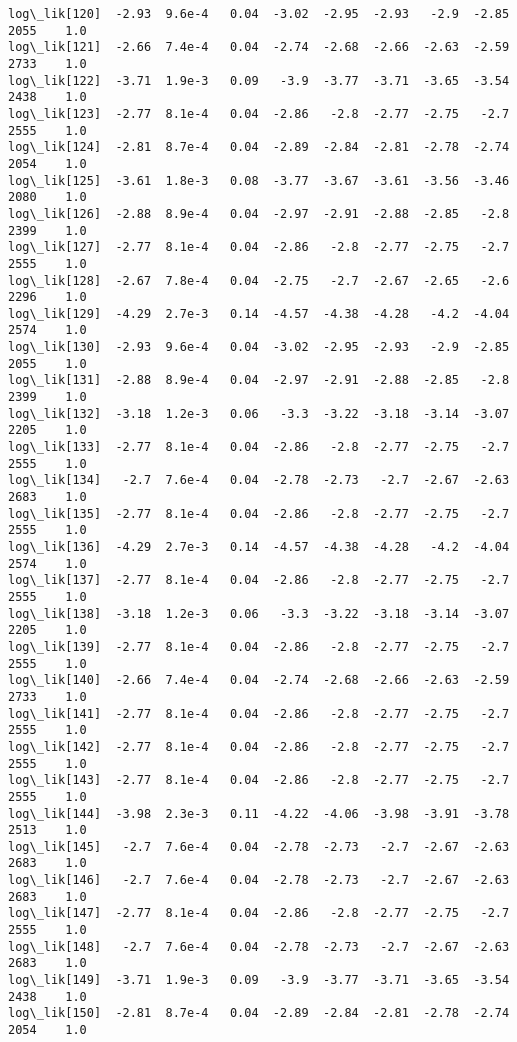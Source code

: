 \documentclass[11pt]{article}
\begin{document}
\begin{Verbatim}[commandchars=\\\{\}]
log\_lik[120]  -2.93  9.6e-4   0.04  -3.02  -2.95  -2.93   -2.9  -2.85   2055    1.0
log\_lik[121]  -2.66  7.4e-4   0.04  -2.74  -2.68  -2.66  -2.63  -2.59   2733    1.0
log\_lik[122]  -3.71  1.9e-3   0.09   -3.9  -3.77  -3.71  -3.65  -3.54   2438    1.0
log\_lik[123]  -2.77  8.1e-4   0.04  -2.86   -2.8  -2.77  -2.75   -2.7   2555    1.0
log\_lik[124]  -2.81  8.7e-4   0.04  -2.89  -2.84  -2.81  -2.78  -2.74   2054    1.0
log\_lik[125]  -3.61  1.8e-3   0.08  -3.77  -3.67  -3.61  -3.56  -3.46   2080    1.0
log\_lik[126]  -2.88  8.9e-4   0.04  -2.97  -2.91  -2.88  -2.85   -2.8   2399    1.0
log\_lik[127]  -2.77  8.1e-4   0.04  -2.86   -2.8  -2.77  -2.75   -2.7   2555    1.0
log\_lik[128]  -2.67  7.8e-4   0.04  -2.75   -2.7  -2.67  -2.65   -2.6   2296    1.0
log\_lik[129]  -4.29  2.7e-3   0.14  -4.57  -4.38  -4.28   -4.2  -4.04   2574    1.0
log\_lik[130]  -2.93  9.6e-4   0.04  -3.02  -2.95  -2.93   -2.9  -2.85   2055    1.0
log\_lik[131]  -2.88  8.9e-4   0.04  -2.97  -2.91  -2.88  -2.85   -2.8   2399    1.0
log\_lik[132]  -3.18  1.2e-3   0.06   -3.3  -3.22  -3.18  -3.14  -3.07   2205    1.0
log\_lik[133]  -2.77  8.1e-4   0.04  -2.86   -2.8  -2.77  -2.75   -2.7   2555    1.0
log\_lik[134]   -2.7  7.6e-4   0.04  -2.78  -2.73   -2.7  -2.67  -2.63   2683    1.0
log\_lik[135]  -2.77  8.1e-4   0.04  -2.86   -2.8  -2.77  -2.75   -2.7   2555    1.0
log\_lik[136]  -4.29  2.7e-3   0.14  -4.57  -4.38  -4.28   -4.2  -4.04   2574    1.0
log\_lik[137]  -2.77  8.1e-4   0.04  -2.86   -2.8  -2.77  -2.75   -2.7   2555    1.0
log\_lik[138]  -3.18  1.2e-3   0.06   -3.3  -3.22  -3.18  -3.14  -3.07   2205    1.0
log\_lik[139]  -2.77  8.1e-4   0.04  -2.86   -2.8  -2.77  -2.75   -2.7   2555    1.0
log\_lik[140]  -2.66  7.4e-4   0.04  -2.74  -2.68  -2.66  -2.63  -2.59   2733    1.0
log\_lik[141]  -2.77  8.1e-4   0.04  -2.86   -2.8  -2.77  -2.75   -2.7   2555    1.0
log\_lik[142]  -2.77  8.1e-4   0.04  -2.86   -2.8  -2.77  -2.75   -2.7   2555    1.0
log\_lik[143]  -2.77  8.1e-4   0.04  -2.86   -2.8  -2.77  -2.75   -2.7   2555    1.0
log\_lik[144]  -3.98  2.3e-3   0.11  -4.22  -4.06  -3.98  -3.91  -3.78   2513    1.0
log\_lik[145]   -2.7  7.6e-4   0.04  -2.78  -2.73   -2.7  -2.67  -2.63   2683    1.0
log\_lik[146]   -2.7  7.6e-4   0.04  -2.78  -2.73   -2.7  -2.67  -2.63   2683    1.0
log\_lik[147]  -2.77  8.1e-4   0.04  -2.86   -2.8  -2.77  -2.75   -2.7   2555    1.0
log\_lik[148]   -2.7  7.6e-4   0.04  -2.78  -2.73   -2.7  -2.67  -2.63   2683    1.0
log\_lik[149]  -3.71  1.9e-3   0.09   -3.9  -3.77  -3.71  -3.65  -3.54   2438    1.0
log\_lik[150]  -2.81  8.7e-4   0.04  -2.89  -2.84  -2.81  -2.78  -2.74   2054    1.0

\end{Verbatim}
\end{document}
